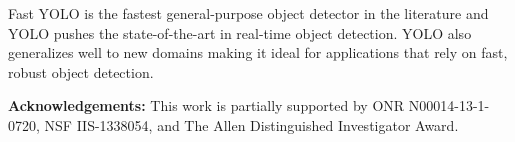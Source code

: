 Fast YOLO is the fastest general-purpose object detector in the literature and YOLO pushes the state-of-the-art in real-time object detection. YOLO also generalizes well to new domains making it ideal for applications that rely on fast, robust object detection.

\noindent\textbf{Acknowledgements:} This work is partially supported by ONR N00014-13-1-0720, NSF IIS-1338054, and The Allen Distinguished Investigator Award.

\pagebreak
{\small


}